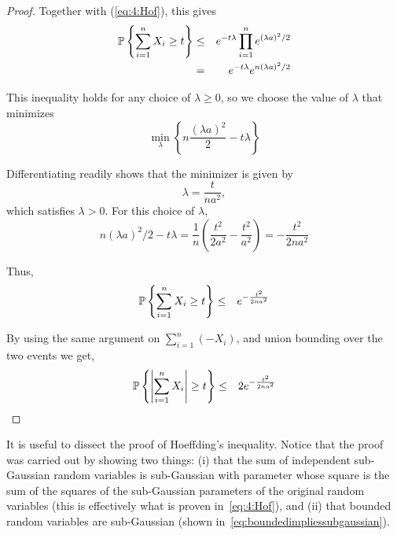 \begin{proof}
Together with (\ref{eq:4:Hof}), this gives
   \begin{eqnarray*}
{\mathbb{P}}\left\{  \sum_{i=1}^n X_i \geq t \right\} &\leq& e^{- t \lambda} \prod_{i=1}^n e^{(\lambda a)^2/2} \\
&=& e^{- t \lambda} e^{n (\lambda a)^2/2}
\end{eqnarray*}

This inequality holds for any choice of $\lambda\geq 0$, so we choose the value of $\lambda$ that minimizes
$$\min_\lambda \left\{ n \frac{(\lambda a)^2}2 - t \lambda \right\}$$

Differentiating readily shows that the minimizer is given by
$$\lambda = \frac{t}{n a^2},$$
which satisfies $\lambda >0$. For this choice of $\lambda$,
$$n(\lambda a)^2/2 - t \lambda = \frac1{n}\left(\frac{t^2}{2a^2} - \frac{t^2}{a^2}\right) = -\frac{t^2}{2na^2}$$

Thus,
\begin{eqnarray*}
{\mathbb{P}}\left\{ \sum_{i=1}^n X_i \geq t \right\} &\leq& e^{-\frac{t^2}{2n a^2}}
\end{eqnarray*}

By using the same argument on $ \sum_{i=1}^n \left( - X_i\right)$, and union bounding over the two events we get,
\begin{eqnarray*}
{\mathbb{P}}\left\{  \left|\sum_{i=1}^n X_i\right| \geq t \right\} &\leq& 2e^{-\frac{t^2}{2na^2}}
\end{eqnarray*}
\end{proof}

\begin{remark}\label{remark:hoeffdingsubgaussian}
It is useful to dissect the proof of Hoeffding's inequality. Notice that the proof was carried out by showing two things: (i) that the sum of independent sub-Gaussian random variables is sub-Gaussian with parameter whose square is the sum of the squares of the sub-Gaussian parameters of the original random variables (this is effectively what is proven in~\eqref{eq:4:Hof}), and (ii) that bounded random variables are sub-Gaussian (shown in~\eqref{eq:boundedimpliessubgaussian}).
\end{remark}

